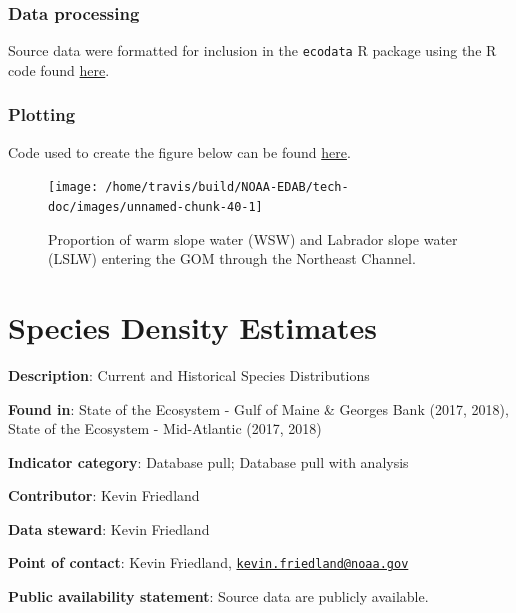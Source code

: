 \documentclass[
]{book}
\begin{document}
\hypertarget{data-processing-26}{%
\subsection{Data processing}\label{data-processing-26}}

Source data were formatted for inclusion in the \texttt{ecodata} R package using the R code found \href{https://github.com/NOAA-EDAB/ecodata/blob/master/data-raw/get_slopewater.R}{here}.

\hypertarget{plotting-29}{%
\subsection{Plotting}\label{plotting-29}}

Code used to create the figure below can be found \href{https://github.com/NOAA-EDAB/ecodata/blob/master/chunk-scripts/LTL.Rmd-wsw-prop.R}{here}.

\begin{figure}

{\centering \texttt{[image: /home/travis/build/NOAA-EDAB/tech-doc/images/unnamed-chunk-40-1]} 

}

\caption{Proportion of warm slope water (WSW) and Labrador slope water (LSLW) entering the GOM through the Northeast Channel.}\label{fig:unnamed-chunk-40}
\end{figure}

\hypertarget{species-density-estimates}{%
\chapter{Species Density Estimates}\label{species-density-estimates}}

\textbf{Description}: Current and Historical Species Distributions

\textbf{Found in}: State of the Ecosystem - Gulf of Maine \& Georges Bank (2017, 2018), State of the Ecosystem - Mid-Atlantic (2017, 2018)

\textbf{Indicator category}: Database pull; Database pull with analysis

\textbf{Contributor}: Kevin Friedland

\textbf{Data steward}: Kevin Friedland

\textbf{Point of contact}: Kevin Friedland, \href{mailto:kevin.friedland@noaa.gov}{\nolinkurl{kevin.friedland@noaa.gov}}

\textbf{Public availability statement}: Source data are publicly available.
\end{document}
